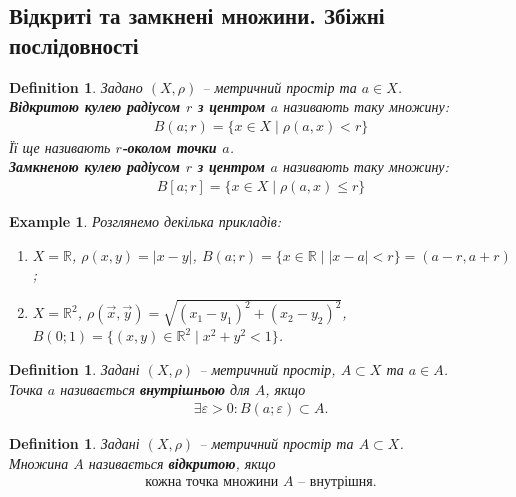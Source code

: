 \documentclass[a4paper, 10pt]{article}
\theoremstyle{theoremdd}
\theoremstyle{theoremdd}
\newtheorem{definition}[theorem]{Definition}
\theoremstyle{theoremdd}
\theoremstyle{theoremdd}
\newtheorem{example}[theorem]{Example}
\theoremstyle{theoremdd}
\theoremstyle{theoremdd}
\theoremstyle{theoremdd}
\theoremstyle{theoremdd}
\begin{document}
\subsection{Відкриті та замкнені множини. Збіжні послідовності}
\begin{definition}
Задано $(X,\rho)$ -- метричний простір та $a \in X$.\\
\textbf{Відкритою кулею радіусом $r$ з центром $a$} називають таку множину:
\begin{align*}
B(a;r) = \{x \in X \mid \rho(a,x) < r\}
\end{align*}
Її ще називають $r$\textbf{-околом точки $a$}.\\
\textbf{Замкненою кулею радіусом $r$ з центром $a$} називають таку множину:
\begin{align*}
B[a;r] = \{x \in X \mid \rho(a,x) \leq r \}
\end{align*}
\end{definition}

\begin{example}
Розглянемо декілька прикладів:
\begin{enumerate}[nosep,wide=0pt,label={\arabic*)}]
\item $X = \mathbb{R}$, $\rho(x,y) = |x-y|$, \qquad $B(a;r) = \{x \in \mathbb{R} \mid |x-a| < r\} = (a-r,a+r)$;
\item $X = \mathbb{R}^2$, $\rho(\vec{x}, \vec{y}) = \sqrt{(x_1-y_1)^2 + (x_2-y_2)^2}$, \qquad $B(0;1) = \{(x,y) \in \mathbb{R}^2 \mid x^2+y^2 <1 \}$.
\end{enumerate}
\end{example}

\begin{definition}
Задані $(X,\rho)$ -- метричний простір, $A \subset X$ та $a \in A$.\\
Точка $a$ називається \textbf{внутрішньою} для $A$, якщо
\begin{align*}
\exists \varepsilon > 0: B(a; \varepsilon) \subset A.
\end{align*}
\end{definition}

\begin{definition}
Задані $(X,\rho)$ -- метричний простір та $A \subset X$.\\
Множина $A$ називається \textbf{відкритою}, якщо
\begin{align*}
\text{кожна точка множини $A$ -- внутрішня.}
\end{align*}
\end{definition}
\end{document}

